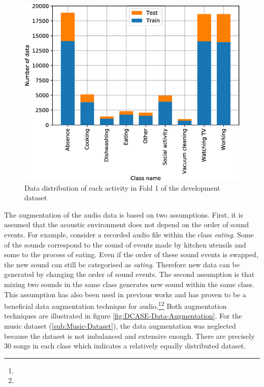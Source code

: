\begin{figure}[htbp]
	\centering
	\includegraphics[scale=0.35]{img/DCASE_unbalanced.png}
	\caption[Data distribution of each activity in Fold 1 of the development dataset]{Data distribution of each activity in Fold 1 of the development dataset \footnotemark}
	\label{fig:DCASE-Unbalanced}
\end{figure}
\noindent
\newline
\newline
The augmentation of the audio data is based on two assumptions. First, it is assumed that the acoustic environment does not depend on the order of sound events. For example, consider a recorded audio file within the class \textit{eating}. Some of the sounds correspond to the sound of events made by kitchen utensils and some to the process of eating. Even if the order of these sound events is swapped, the new sound can still be categorised as \textit{eating}. Therefore new data can be generated by changing the order of sound events. The second assumption is that mixing two sounds in the same class generates new sound within the same class. This assumption has also been used in previous works and has proven to be a beneficial data augmentation technique for audio.\footnote{}\footnote{} Both augmentation techniques are illustrated in figure \ref{fig:DCASE-Data-Augmentation}.
\newline
\newline
For the music dataset (\ref{sub:Music-Dataset}), the data augmentation was neglected because the dataset is not imbalanced and extensive enough. There are precisely 30 songs in each class which indicates a relatively equally distributed dataset.
